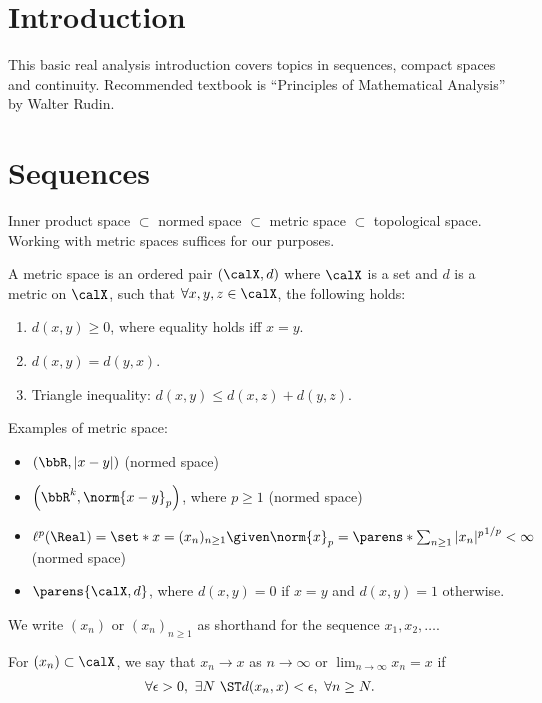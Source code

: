 \documentclass[../aipt.tex]{subfiles}
\begin{document}

\section{Introduction}
This basic real analysis introduction covers topics in sequences, compact spaces and continuity. Recommended textbook is ``Principles of Mathematical Analysis'' by Walter Rudin. 

\section{Sequences}
Inner product space $\subset$ normed space $\subset$ metric space $\subset$ topological space. Working with metric spaces suffices for our purposes.

\begin{Definition}
A metric space is an ordered pair $\left(\calX, d\right)$ where $\calX$ is a set and $d$ is a metric on $\calX$, such that $\forall x, y, z \in \calX$, the following holds:
\begin{enumerate}[1)]
\item $d(x,y) \geq 0$, where equality holds iff $x=y$.
\item $d(x,y)=d(y,x)$.
\item Triangle inequality: $d(x,y) \leq d(x,z) + d(y,z)$.
\end{enumerate}
\end{Definition}

\begin{Example} Examples of metric space:
\begin{itemize} 
\item $\left(\bbR, |x-y|\right)$ (normed space)
\item $\left(\bbR^k, \norm{x-y}_p\right)$, where $p \geq 1$ (normed space)
\item $\ell^p(\Real) = \set*{ x = (x_n)_{n\geq1} \given \norm{x}_p=\parens*{\sum_{n\geq1} |x_n|^p}^{1/p} < \infty}$ (normed space)
\item $\parens{\calX, d}$, where $d(x,y)=0$ if $x=y$ and $d(x,y)=1$ otherwise.
\end{itemize}
\end{Example}

We write $(x_n)$ or $(x_n)_{n\geq1}$ as shorthand for the sequence $x_1, x_2, \ldots$.

\begin{Definition}
For $(x_n) \subset \calX$, we say that $x_n \to x$ as $n\to\infty$ or $\lim_{n\to\infty} x_n=x$ if 
\begin{align*}
\forall \epsilon>0,\ \exists N\ \ST d(x_n, x) < \epsilon,\ \forall n \geq N.
\end{align*}
\end{Definition}
\end{document}
